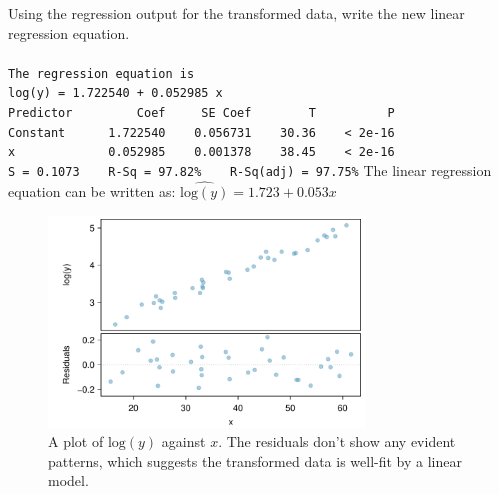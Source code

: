 \begin{examplewrap}
\begin{nexample}{Using the regression output for the transformed data, write the new linear regression equation.\\
\\
\texttt{The regression equation is} \\

\texttt{log(y) = 1.722540 + 0.052985 x} \\

\texttt{Predictor \ \ \ \ \ \ \ \ Coef \ \ \ \ SE Coef \ \ \ \ \ \ \ T \ \ \ \ \ \ \ \ \ P} \\
\texttt{Constant \ \ \ \ \ 1.722540 \ \ \ 0.056731 \ \ \ 30.36 \ \ \ < 2e-16} \\
\texttt{x \ \ \ \ \ \ \ \ \ \ \ \ 0.052985 \ \ \ 0.001378 \ \ \ 38.45 \ \ \ < 2e-16} \\


\texttt{S = 0.1073\ \ \ \ R-Sq = 97.82\% \ \ \ R-Sq(adj) = 97.75\%}}
The linear regression equation can be written as:  $\widehat{\text{log}(y)} = 1.723 +0.053 x$
\end{nexample}
\end{examplewrap}

\begin{figure}[h]
   \centering
   \includegraphics[width=0.75\textwidth]{ch_regr_simple_linear/figures/NeedsTransform/NeedsTransform-PostTransform}
   \caption{A plot of $\text{log}(y)$ against $x$. The residuals don't show any evident patterns, which suggests the transformed data is well-fit by a linear model.}
   \label{NeedsTransform-PostTransform}
\end{figure}



